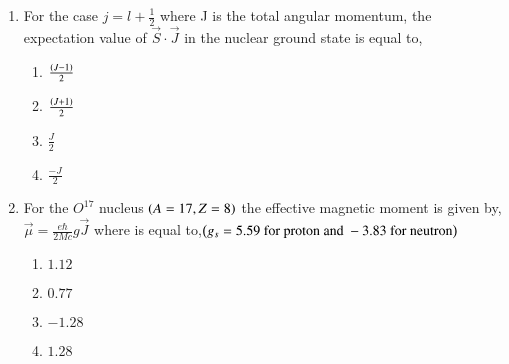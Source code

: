 \documentclass[journal]{IEEEtran}
\begin{document}
\begin{enumerate}[start=40]
\item  For the case $j=l+\frac{1}{2}$ where J is the total angular momentum, the expectation value of $\overrightarrow{S}\cdot\overrightarrow{J}$ in
the nuclear ground state is equal to, 
\begin{multicols}{4}
    \begin{enumerate}
        \item $\frac{\left(J-1\right)}{2}$
        \item $\frac{\left(J+1\right)}{2}$
        \item $\frac{J}{2}$
        \item $\frac{-J}{2}$
    \end{enumerate}
\end{multicols}
\bigskip
\item For the $O^{17}$ nucleus $\left(A=17,Z=8\right)$ the effective magnetic moment is given by,$\overrightarrow{\mu}=\frac{e\hbar}{2Mc} g\overrightarrow{J}$ where is equal to,$\left(g_{s} = 5.59 \text{ for proton and } -3.83 \text{ for neutron}\right)$
\begin{multicols}{4}
    \begin{enumerate}
        \item $1.12$
        \item $0.77$
        \item $-1.28$
        \item $1.28$
    \end{enumerate}
\end{multicols}







\end{enumerate}
\end{document}
